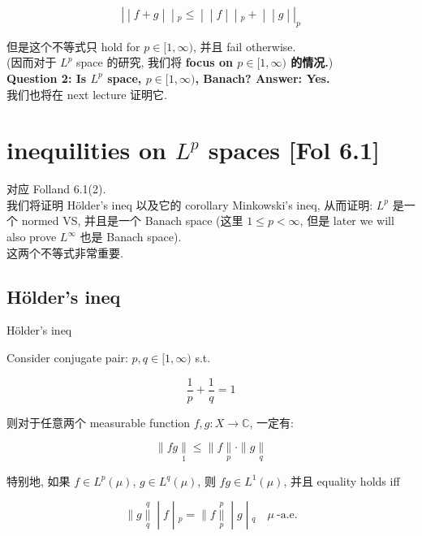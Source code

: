 \documentclass{qlnotes-export}
\begin{document}
\[\left. | \middle| f + g \middle| \middle| {}_{p} \leq \middle| \middle| f \middle| \middle| {}_{p} + \middle| \middle| g \middle| |_{p} \right.\]

但是这个不等式只 hold for \(p \in \lbrack 1,\infty)\), 并且 fail otherwise.\\
(因而对于 \(L^{p}\) space 的研究, 我们将 \textbf{focus on \(p \in \lbrack 1,\infty)\) 的情况.})\\
\textbf{Question 2: Is \(L^{p}\) space, \(p \in \lbrack 1,\infty)\), Banach? Answer: Yes.}\\
我们也将在 next lecture 证明它.

\section{\texorpdfstring{inequilities on \(L^{p}\) spaces {[}Fol 6.1{]}}{inequilities on L\^{}\{p\} spaces {[}Fol 6.1{]}}}

对应 Folland 6.1(2).\\
我们将证明 Hölder's ineq 以及它的 corollary Minkowski's ineq, 从而证明: \(L^{p}\) 是一个 normed VS, 并且是一个 Banach space (这里 \(1 \leq p < \infty\), 但是 later we will also prove \(L^{\infty}\) 也是 Banach space).\\
这两个不等式非常重要.

\subsection{Hölder's ineq}\label{huxf6lders-ineq}

\begin{theorem}{Hölder's ineq}\label{thm-09-l-p-space-and-inequalities-h-lder-s-ineq}

Consider conjugate pair: \(p,q \in \lbrack 1,\infty)\) s.t.

\[\frac{1}{p} + \frac{1}{q} = 1\]

则对于任意两个 measurable function \(f,g:X\rightarrow{\mathbb{C}}\), 一定有:

\[\parallel fg\underset{1}{\parallel} \leq \parallel f\underset{p}{\parallel} \cdot \parallel g\underset{q}{\parallel}\]

特别地, 如果 \(f \in L^{p}(\mu)\), \(g \in L^{q}(\mu)\), 则 \(fg \in L^{1}(\mu)\), 并且 equality holds iff

\[\left. \parallel g\underset{q}{\overset{q}{\parallel}} \middle| f \middle| {}_{p} = \parallel f\underset{p}{\overset{p}{\parallel}} \middle| g \middle| {}_{q}\quad\mu\ \text{-a.e.} \right.\]

\end{theorem}
\end{document}
